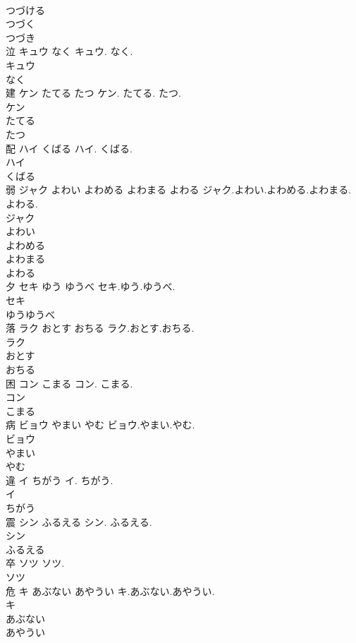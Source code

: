 \documentclass[8pt]{extreport}
\begin{document}
\begin{CJK}{UTF8}{min}
\\	つづける
\\	つづく
\\	つづき
\\	泣	キュウ なく	キュウ. なく.	
\\	キュウ
\\	なく
\\	建	ケン たてる たつ	ケン. たてる. たつ.	
\\	ケン
\\	たてる
\\	たつ
\\	配	ハイ くばる	ハイ. くばる.	
\\	ハイ
\\	くばる
\\	弱	ジャク よわい よわめる よわまる よわる	ジャク.よわい.よわめる.よわまる.よわる.	
\\	ジャク
\\	よわい
\\	よわめる
\\	よわまる
\\	よわる
\\	夕	セキ ゆう ゆうべ	セキ.ゆう.ゆうべ.	
\\	セキ
\\	ゆうゆうべ
\\	落	ラク おとす おちる	ラク.おとす.おちる.	
\\	ラク
\\	おとす
\\	おちる
\\	困	コン こまる	コン. こまる.	
\\	コン
\\	こまる
\\	病	ビョウ やまい やむ	ビョウ.やまい.やむ.	
\\	ビョウ
\\	やまい
\\	やむ
\\	違	イ ちがう	イ. ちがう.	
\\	イ
\\	ちがう
\\	震	シン ふるえる	シン. ふるえる.	
\\	シン
\\	ふるえる
\\	卒	ソツ	ソツ.	
\\	ソツ
\\	危	キ あぶない あやうい	キ.あぶない.あやうい.	
\\	キ
\\	あぶない
\\	あやうい

\end{CJK}
\end{document}
